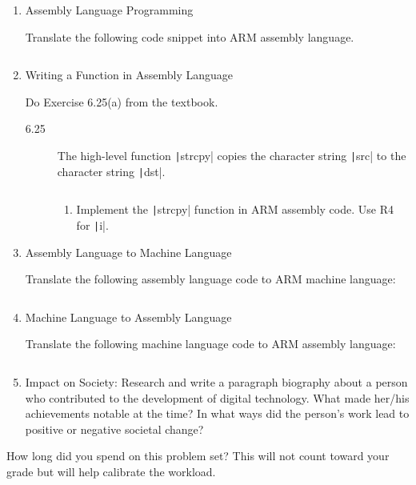 \documentclass{e85}
\date{2019 April 10 (Wednesday)}
\author{}
\begin{document}
\begin{enumerate}
\item Assembly Language Programming

  Translate the following code snippet into ARM assembly language.

  \inputminted{c}{code/assembly-language-programming.c}

  \begin{solution}
  \end{solution}

\item Writing a Function in Assembly Language

  Do Exercise 6.25(a) from the textbook.
  \begin{description}
  \item[6.25] The high-level function \texttt|strcpy| copies
    the character string \texttt|src| to the character string
    \texttt|dst|.

    \inputminted{c}{code/writing-a-function-in-assembly-language.c}

    \begin{enumerate}[label=(\alph*)]
    \item Implement the \texttt|strcpy| function in ARM
      assembly code.  Use R4 for \texttt|i|.

      \begin{solution}
      \end{solution}
    \end{enumerate}
  \end{description}

\item Assembly Language to Machine Language

  Translate the following assembly language code to ARM machine
  language:

  \inputminted{text}{code/assembly-language-to-machine-language.arm}

  \begin{solution}
  \end{solution}

\item Machine Language to Assembly Language

  Translate the following machine language code to ARM assembly
  language:

  \inputminted{text}{code/machine-language-to-assembly-language}

  \begin{solution}
  \end{solution}

\item Impact on Society: Research and write a paragraph biography
  about a person who contributed to the development of digital
  technology.  What made her/his achievements notable at the time?  In
  what ways did the person's work lead to positive or negative
  societal change?

  \begin{solution}
  \end{solution}
\end{enumerate}

How long did you spend on this problem set?  This will not count
toward your grade but will help calibrate the workload.

\begin{solution}
\end{solution}
\end{document}
